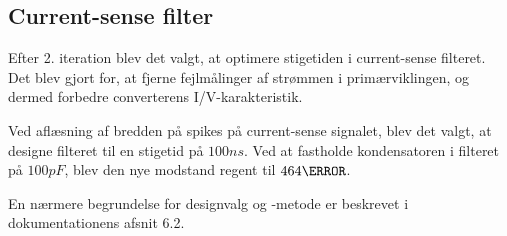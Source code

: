 
\subsection{Current-sense filter}
Efter 2. iteration blev det valgt, at optimere stigetiden i current-sense filteret. Det blev gjort for, at fjerne fejlmålinger af strømmen i primærviklingen, og dermed forbedre converterens I/V-karakteristik. 

Ved aflæsning af bredden på spikes på current-sense signalet, blev det valgt, at designe filteret til en stigetid på $100ns$. Ved at fastholde kondensatoren i filteret på $100pF$, blev den nye modstand regent til $464\ohm$. 

En nærmere begrundelse for designvalg og -metode er beskrevet i dokumentationens afsnit 6.2.